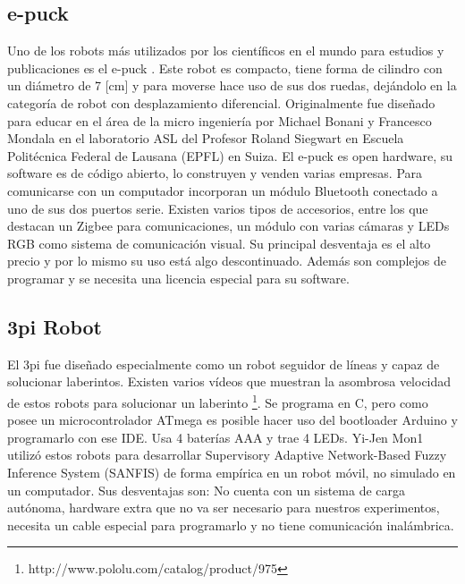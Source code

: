 \subsection{e-puck}
Uno de los robots más utilizados por los científicos en el mundo para estudios y publicaciones es el e-puck \cite{mondada2009puck}. Este robot es compacto, tiene forma de cilindro con un diámetro de 7 [cm] y para moverse hace uso de sus dos ruedas, dejándolo en la categoría de robot con desplazamiento diferencial. Originalmente fue diseñado para educar en el área de la micro ingeniería por Michael Bonani y Francesco Mondala en el laboratorio ASL del Profesor Roland Siegwart en Escuela Politécnica Federal de Lausana (EPFL) en Suiza. El e-puck es open hardware, su software es de código abierto,  lo construyen y venden varias empresas. Para comunicarse con un computador incorporan un módulo Bluetooth conectado a uno de sus dos puertos serie. Existen varios tipos de accesorios, entre los que destacan un Zigbee para comunicaciones, un módulo con varias cámaras y LEDs RGB como sistema de comunicación visual. Su principal desventaja es el alto precio y por lo mismo su uso está algo descontinuado. Además son complejos de programar y se necesita una licencia especial para su software.

\subsection{3pi Robot}

El 3pi fue diseñado especialmente como un robot seguidor de líneas y capaz de solucionar laberintos. Existen varios vídeos que muestran la asombrosa velocidad de estos robots para solucionar un laberinto \footnote{http://www.pololu.com/catalog/product/975}. Se programa en C, pero como posee un microcontrolador ATmega es posible hacer uso del bootloader Arduino y programarlo con ese IDE. Usa 4 baterías AAA y trae 4 LEDs.  Yi-Jen Mon1 utilizó estos robots para desarrollar Supervisory Adaptive Network-Based Fuzzy Inference System (SANFIS) de forma empírica en un robot móvil, no simulado en un computador. Sus desventajas son: No cuenta con un sistema de carga autónoma, hardware extra que no va ser necesario para nuestros experimentos, necesita un cable especial para programarlo y no tiene comunicación inalámbrica.


